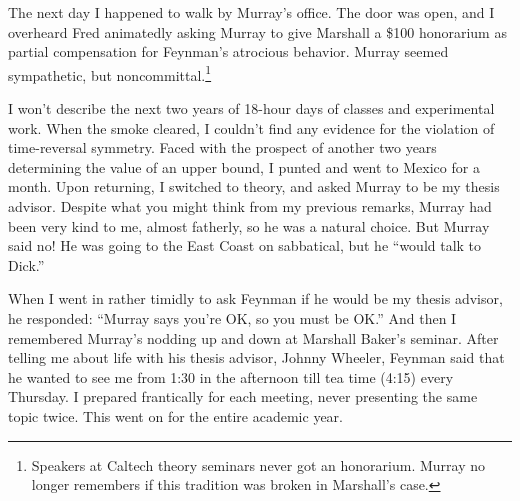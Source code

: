 \documentclass[12pt]{article}
\begin{document}
The next day I happened to walk by Murray's office. The door was open, and I overheard Fred animatedly asking Murray to give Marshall a \$100 honorarium as partial compensation for Feynman's atrocious behavior. Murray seemed sympathetic, but noncommittal.\footnote{Speakers at Caltech theory seminars never got an honorarium. Murray no longer remembers if this tradition was broken in Marshall's case.}

I won't describe the next two years of 18-hour days of classes and experimental work. When the smoke cleared, I couldn't find any evidence for the violation of time-reversal symmetry. Faced with the prospect of another two years determining the value of an upper bound, I punted and went to Mexico for a month. Upon returning, I switched to theory, and asked Murray to be my thesis advisor. Despite what you might think from my previous remarks, Murray had been very kind to me, almost fatherly, so he was a natural choice. But Murray said no! He was going to the East Coast on sabbatical, but he ``would talk to Dick.'' 

When I went in rather timidly to ask Feynman if he would be my thesis advisor, he responded: ``Murray says you're OK, so you must be OK.'' And then I remembered Murray's nodding up and down at Marshall Baker's seminar. After telling me about life with his thesis advisor, Johnny Wheeler, Feynman said that he wanted to see me from 1:30 in the afternoon till tea time (4:15) every Thursday. I prepared frantically for each meeting, never presenting the same topic twice. This went on for the entire academic year.
\end{document}
